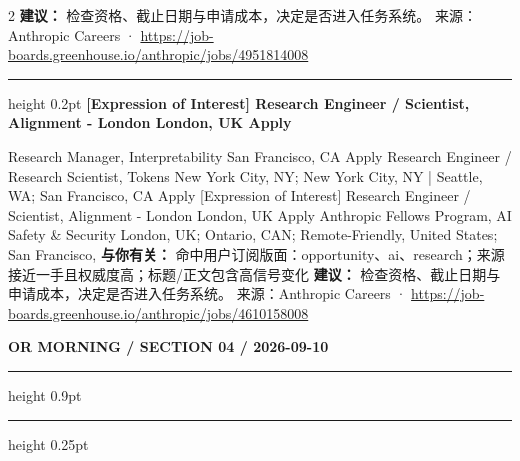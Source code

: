 \documentclass[10.5pt]{ctexart}
\begin{document}
\begin{multicols}{2}
\textbf{建议：} 检查资格、截止日期与申请成本，决定是否进入任务系统。
{\footnotesize\color{ormuted} 来源：Anthropic Careers · \url{https://job-boards.greenhouse.io/anthropic/jobs/4951814008}}
\vspace{2mm}
\hrule height 0.2pt
\vspace{2mm}
{\large\bfseries [Expression of Interest] Research Engineer / Scientist, Alignment - London London, UK Apply}\par
[Expression of Interest] Research Manager, Interpretability San Francisco, CA Apply Research Engineer / Research Scientist, Tokens New York City, NY; New York City, NY | Seattle, WA; San Francisco, CA Apply [Expression of Interest] Research Engineer / Scientist, Alignment - London London, UK Apply Anthropic Fellows Program, AI Safety \& Security London, UK; Ontario, CAN; Remote-Friendly, United States; San Francisco, 
\textbf{与你有关：} 命中用户订阅版面：opportunity、ai、research；来源接近一手且权威度高；标题/正文包含高信号变化
\textbf{建议：} 检查资格、截止日期与申请成本，决定是否进入任务系统。
{\footnotesize\color{ormuted} 来源：Anthropic Careers · \url{https://job-boards.greenhouse.io/anthropic/jobs/4610158008}}
\end{multicols}
\newpage
{\small\bfseries OR MORNING / SECTION 04 / 2026-09-10}
\vspace{2mm}
\hrule height 0.9pt
\vspace{1.5mm}
\hrule height 0.25pt
\vspace{4mm}
\end{document}
